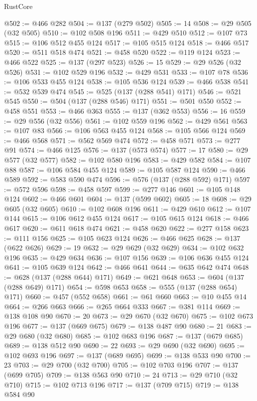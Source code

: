 \begin{lexlean}{RustCore}
\begin{coremodule}
{\begin{coremodule}
{{{{{{{{{{{{{{{{{{{{{{{{{{{{{{{{{{{{{{{{{{{{{@502 := @466 @282
@504 := @137 (@279 @502)
@505 := 14
@508 := @29 @505 (@32 @505)
@510 := @102 @508 @196
@511 := @429 @510
@512 := @107 @73
@515 := @106 @512 @455 @124
@517 := @105 @515 @124
@518 := @466 @517
@520 := @511 @518 @474
@521 := @458 @520
@522 := @119 @124
@523 := @466 @522
@525 := @137 (@297 @523)
@526 := 15
@529 := @29 @526 (@32 @526)
@531 := @102 @529 @196
@532 := @429 @531
@533 := @107 @78
@536 := @106 @533 @455 @124
@538 := @105 @536 @124
@539 := @466 @538
@541 := @532 @539 @474
@545 := @525 (@137 (@288 @541) @171)
@546 := @521 @545
@550 := @504 (@137 (@288 @546) @171)
@551 := @501 @550
@552 := @458 @551
@553 := @466 @363
@555 := @137 (@362 @553)
@556 := 16
@559 := @29 @556 (@32 @556)
@561 := @102 @559 @196
@562 := @429 @561
@563 := @107 @83
@566 := @106 @563 @455 @124
@568 := @105 @566 @124
@569 := @466 @568
@571 := @562 @569 @474
@572 := @458 @571
@573 := @277 @91
@574 := @466 @125
@576 := @137 (@573 @574)
@577 := 17
@580 := @29 @577 (@32 @577)
@582 := @102 @580 @196
@583 := @429 @582
@584 := @107 @88
@587 := @106 @584 @455 @124
@589 := @105 @587 @124
@590 := @466 @589
@592 := @583 @590 @474
@596 := @576 (@137 (@288 @592) @171)
@597 := @572 @596
@598 := @458 @597
@599 := @277 @146
@601 := @105 @148 @124
@602 := @466 @601
@604 := @137 (@599 @602)
@605 := 18
@608 := @29 @605 (@32 @605)
@610 := @102 @608 @196
@611 := @429 @610
@612 := @107 @144
@615 := @106 @612 @455 @124
@617 := @105 @615 @124
@618 := @466 @617
@620 := @611 @618 @474
@621 := @458 @620
@622 := @277 @158
@623 := @111 @156
@625 := @105 @623 @124
@626 := @466 @625
@628 := @137 (@622 @626)
@629 := 19
@632 := @29 @629 (@32 @629)
@634 := @102 @632 @196
@635 := @429 @634
@636 := @107 @156
@639 := @106 @636 @455 @124
@641 := @105 @639 @124
@642 := @466 @641
@644 := @635 @642 @474
@648 := @628 (@137 (@288 @644) @171)
@649 := @621 @648
@653 := @604 (@137 (@288 @649) @171)
@654 := @598 @653
@658 := @555 (@137 (@288 @654) @171)
@660 := @457 (@552 @658)
@661 := @61 @660
@663 := @10 @455 @14
@664 := @266 @663
@666 := @265 @664 @333
@667 := @381 @114
@669 := @138 @108 @90
@670 := 20
@673 := @29 @670 (@32 @670)
@675 := @102 @673 @196
@677 := @137 (@669 @675)
@679 := @138 @487 @90
@680 := 21
@683 := @29 @680 (@32 @680)
@685 := @102 @683 @196
@687 := @137 (@679 @685)
@689 := @138 @512 @90
@690 := 22
@693 := @29 @690 (@32 @690)
@695 := @102 @693 @196
@697 := @137 (@689 @695)
@699 := @138 @533 @90
@700 := 23
@703 := @29 @700 (@32 @700)
@705 := @102 @703 @196
@707 := @137 (@699 @705)
@709 := @138 @563 @90
@710 := 24
@713 := @29 @710 (@32 @710)
@715 := @102 @713 @196
@717 := @137 (@709 @715)
@719 := @138 @584 @90
}}}}}}}}}}}}}}}}}}}}}}}}}}}}}}}}}}}}}}}}}}}}}
\end{coremodule}}
\end{coremodule}
\end{lexlean}
